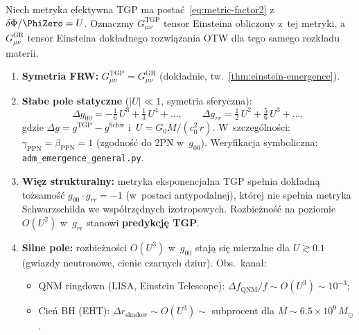 \begin{proposition}\label{prop:emergence-hierarchy}
Niech metryka efektywna TGP ma posta\'c~\eqref{eq:metric-factor2}
z~$\delta\Phi/\PhiZero = U$. Oznaczmy $G_{\mu\nu}^{\mathrm{TGP}}$
tensor Einsteina obliczony z~tej metryki, a~$G_{\mu\nu}^{\mathrm{GR}}$
tensor Einsteina dok\l{}adnego rozwi\k{a}zania OTW
dla tego samego rozk\l{}adu materii.
\begin{enumerate}[nosep]
  \item \textbf{Symetria FRW:}
    $G_{\mu\nu}^{\mathrm{TGP}} = G_{\mu\nu}^{\mathrm{GR}}$
    (dok\l{}adnie, tw.~\ref{thm:einstein-emergence}).
  \item \textbf{S\l{}abe pole statyczne} ($|U| \ll 1$, symetria sferyczna):
    \begin{equation}\label{eq:emergence-PN}
      \Delta g_{00} = -\tfrac{1}{6}\,U^3 + \tfrac{1}{3}\,U^4 + \ldots,
      \qquad
      \Delta g_{rr} = \tfrac{1}{2}\,U^2 + \tfrac{5}{6}\,U^3 + \ldots,
    \end{equation}
    gdzie $\Delta g = g^{\mathrm{TGP}} - g^{\mathrm{Schw}}$
    i~$U = G_0 M/(c_0^2\,r)$.
    W~szczeg\'olno\'sci: $\gamma_{\mathrm{PPN}} = \beta_{\mathrm{PPN}} = 1$
    (zgodno\'s\'c do 2PN w~$g_{00}$).
    Weryfikacja symboliczna: \texttt{adm\_emergence\_general.py}.
  \item \textbf{Wi\k{e}z strukturalny:}
    metryka eksponencjalna TGP spe\l{}nia dok\l{}adn\k{a}
    to\.zsamo\'s\'c $g_{00}\cdot g_{rr} = -1$ (w~postaci antypodalnej),
    kt\'orej nie spe\l{}nia metryka Schwarzschilda
    we wsp\'o\l{}rz\k{e}dnych izotropowych.
    Rozbie\.zno\'s\'c na poziomie $O(U^2)$ w~$g_{rr}$
    stanowi \textbf{predykcj\k{e} TGP}.
  \item \textbf{Silne pole:} rozbie\.zno\'sci $O(U^3)$ w~$g_{00}$
    staj\k{a} si\k{e} mierzalne dla $U \gtrsim 0.1$ (gwiazdy
    neutronowe, cienie czarnych dziur). Obs.~kana\l{}:
    \begin{itemize}[nosep]
      \item QNM ringdown (LISA, Einstein Telescope):
        $\Delta f_{\mathrm{QNM}}/f \sim O(U^3) \sim 10^{-3}$;
      \item Cie\'n BH (EHT): $\Delta r_{\mathrm{shadow}}
        \sim O(U^3) \sim$ subprocent dla $M \sim 6.5 \times 10^9\,M_\odot$.
    \end{itemize}
\end{enumerate}
\end{proposition}

